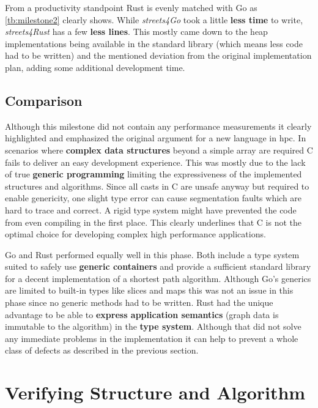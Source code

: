 From a productivity standpoint Rust is evenly matched with Go as \autoref{tb:milestone2} clearly shows. While \textit{streets4Go} took a little \textbf{less time} to write, \textit{streets4Rust} has a few \textbf{less lines}. This mostly came down to the heap implementations being available in the standard library (which means less code had to be written) and the mentioned deviation from the original implementation plan, adding some additional development time.

\subsection{Comparison}
\label{subsec:Implementation::Graph_Representation::Comparison}

Although this milestone did not contain any performance measurements it clearly highlighted and emphasized the original argument for a new language in \acrlong{hpc}. In scenarios where \textbf{complex data structures} beyond a simple array are required C fails to deliver an easy development experience. This was mostly due to the lack of true \textbf{generic programming} limiting the expressiveness of the implemented structures and algorithms. Since all casts in C are unsafe anyway but required to enable genericity, one slight type error can cause segmentation faults which are hard to trace and correct. A rigid type system might have prevented the code from even compiling in the first place. This clearly underlines that C is not the optimal choice for developing complex high performance applications.

Go and Rust performed equally well in this phase. Both include a type system suited to safely use \textbf{generic containers} and provide a sufficient standard library for a decent implementation of a shortest path algorithm. Although Go's generics are limited to built-in types like slices and maps this was not an issue in this phase since no generic methods had to be written. Rust had the unique advantage to be able to \textbf{express application semantics} (graph data is immutable to the algorithm) in the \textbf{type system}. Although that did not solve any immediate problems in the implementation it can help to prevent a whole class of defects as described in the previous section.

\section{Verifying Structure and Algorithm}
\label{sec:Implementation::Verification}

